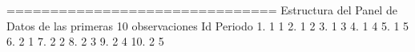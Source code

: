 {\smallskip}
===============================
{\smallskip}
Estructura del Panel de Datos de las primeras 10 observaciones
{\smallskip}
{\smallskip}
     {\TLC}
     {\VBAR} Id   Periodo {\VBAR}
     {\LFTT}
  1. {\VBAR}  1         1 {\VBAR}
  2. {\VBAR}  1         2 {\VBAR}
  3. {\VBAR}  1         3 {\VBAR}
  4. {\VBAR}  1         4 {\VBAR}
  5. {\VBAR}  1         5 {\VBAR}
     {\LFTT}
  6. {\VBAR}  2         1 {\VBAR}
  7. {\VBAR}  2         2 {\VBAR}
  8. {\VBAR}  2         3 {\VBAR}
  9. {\VBAR}  2         4 {\VBAR}
 10. {\VBAR}  2         5 {\VBAR}
     {\BLC}
{\smallskip}
